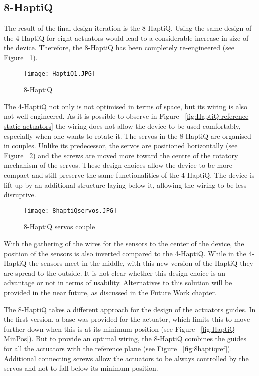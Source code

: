 \subsection{8-HaptiQ}
The result of the final design iteration is the 8-HaptiQ. Using the same design of the 4-HaptiQ for eight actuators would lead to a considerable increase in size of the device. Therefore, the 8-HaptiQ has been completely re-engineered (see Figure ~\ref{fig:8-HaptiQ}). 

\begin{figure}[H]
  \centering
  \texttt{[image: HaptiQ1.JPG]}
  \caption{8-HaptiQ}
  \label{fig:8-HaptiQ}
\end{figure}

The 4-HaptiQ not only is not optimised in terms of space, but its wiring is also not well engineered. As it is possible to observe in Figure ~\ref{fig:HaptiQ reference static actuators} the wiring does not allow the device to be used comfortably, especially when one wants to rotate it. 
The servos in the 8-HaptiQ are organised in couples. Unlike its predecessor, the servos are positioned horizontally (see Figure ~\ref{fig:8-HaptiQservos}) and the screws are moved more toward the centre of the rotatory mechanism of the servos. These design choices allow the device to be more compact and still preserve the same functionalities of the 4-HaptiQ. 
The device is lift up by an additional structure laying below it, allowing the wiring to be less disruptive. 

\begin{figure}[H]
  \centering
  \texttt{[image: 8haptiQservos.JPG]}
  \caption{8-HaptiQ servos couple}
  \label{fig:8-HaptiQservos}
\end{figure}

With the gathering of the wires for the sensors to the center of the device, the position of the sensors is also inverted compared to the 4-HaptiQ. While in the 4-HaptiQ the sensors meet in the middle, with this new version of the HaptiQ they are spread to the outside. It is not clear whether this design choice is an advantage or not in terms of usability. Alternatives to this solution will be provided in the near future, as discussed in the Future Work chapter.

The 8-HaptiQ takes a different approach for the design of the actuators guides. In the first version, a base was provided for the actuator, which limits this to move further down when this is at its minimum position (see Figure ~\ref{fig:HaptiQ MinPos}). But to provide an optimal wiring, the 8-HaptiQ combines the guides for all the actuators with the reference plane (see Figure ~\ref{fig:8haptiqref}). Additional connecting screws allow the actuators to be always controlled by the servos and not to fall below its minimum position. 

